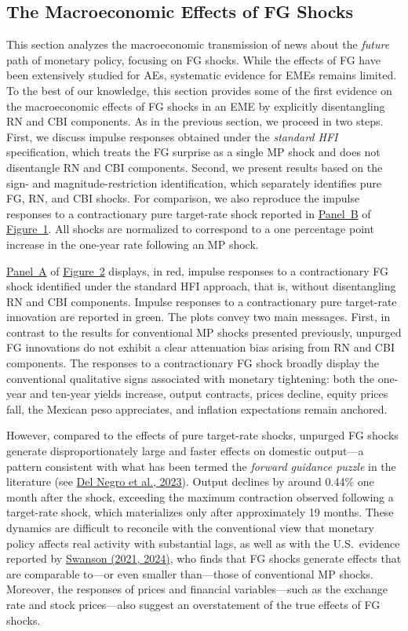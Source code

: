 \documentclass[12pt, reqno]{article}
\begin{document}
\subsection{The Macroeconomic Effects of FG Shocks}

This section analyzes the macroeconomic transmission of news about the \emph{future} path of monetary policy, focusing on FG shocks. While the effects of FG have been extensively studied for AEs, systematic evidence for EMEs remains limited. To the best of our knowledge, this section provides some of the first evidence on the macroeconomic effects of FG shocks in an EME by explicitly disentangling RN and CBI components. As in the previous section, we proceed in two steps. First, we discuss impulse responses obtained under the \emph{standard HFI} specification, which treats the FG surprise as a single MP shock and does not disentangle RN and CBI components. Second, we present results based on the sign- and magnitude-restriction identification, which separately identifies pure FG, RN, and CBI shocks. For comparison, we also reproduce the impulse responses to a contractionary pure target-rate shock reported in \hyperlink{Panel BF1}{Panel~B} of \hyperlink{Figure~1}{Figure~1}. All shocks are normalized to correspond to a one percentage point increase in the one-year rate following an MP shock.

\hyperlink{Panel BF1}{Panel~A} of \hyperlink{Figure~2}{Figure~2} displays, in red, impulse responses to a contractionary FG shock identified under the standard HFI approach, that is, without disentangling RN and CBI components. Impulse responses to a contractionary pure target-rate innovation are reported in green. The plots convey two main messages. First, in contrast to the results for conventional MP shocks presented previously, unpurged FG innovations do not exhibit a clear attenuation bias arising from RN and CBI components. The responses to a contractionary FG shock broadly display the conventional qualitative signs associated with monetary tightening: both the one-year and ten-year yields increase, output contracts, prices decline, equity prices fall, the Mexican peso appreciates, and inflation expectations remain anchored. 

However, compared to the effects of pure target-rate shocks, unpurged FG shocks generate disproportionately large and faster effects on domestic output—a pattern consistent with what has been termed the \emph{forward guidance puzzle} in the literature (see \hyperlink{Del Negro et al. (2023)}{Del Negro et al., 2023}). Output declines by around 0.44\% one month after the shock, exceeding the maximum contraction observed following a target-rate shock, which materializes only after approximately 19 months. These dynamics are difficult to reconcile with the conventional view that monetary policy affects real activity with substantial lags, as well as with the U.S.\ evidence reported by \hyperlink{Swanson (2021, 2024)}{Swanson (2021, 2024)}, who finds that FG shocks generate effects that are comparable to—or even smaller than—those of conventional MP shocks. Moreover, the responses of prices and financial variables—such as the exchange rate and stock prices—also suggest an overstatement of the true effects of FG shocks.
\end{document}
